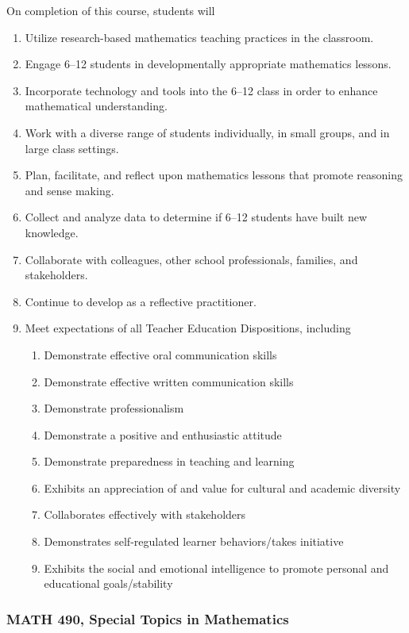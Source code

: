 \documentclass[11pt]{article}
\newenvironment{alphalist}{
\begin{enumerate}[label=(\arabic*),widest=107 ,leftmargin=25pt, itemsep=0pt]}
{\end{enumerate}}
\newenvironment{betalist}{
\begin{enumerate}[label=(\alph*),widest=zzz,leftmargin=25pt,itemsep=0pt]}
{\end{enumerate}}
\begin{document}
On completion of this course, students will
\begin{alphalist}
\item Utilize research-based mathematics teaching practices in the classroom.
\item Engage 6--12 students in developmentally appropriate mathematics lessons.
\item Incorporate technology and tools into the 6--12 class in order to enhance mathematical understanding.
\item Work with a diverse range of students individually, in small groups, and in large class settings.
\item Plan, facilitate, and reflect upon mathematics lessons that promote reasoning and sense making.
\item Collect and analyze data to determine if 6--12 students have built new knowledge. 
\item Collaborate with colleagues, other school professionals, families, and stakeholders.
\item Continue to develop as a reflective practitioner.
\item Meet expectations of all Teacher Education Dispositions, including
\begin{betalist}
\item Demonstrate effective oral communication skills
\item Demonstrate effective written communication skills
\item Demonstrate professionalism
\item Demonstrate a positive and enthusiastic attitude
\item Demonstrate preparedness in teaching and learning
\item Exhibits an appreciation of and value for cultural and academic diversity
\item Collaborates effectively with stakeholders
\item Demonstrates self-regulated learner behaviors/takes initiative
\item Exhibits the social and emotional intelligence to promote personal and educational goals/stability
\end{betalist}
\end{alphalist}

\subsubsection*{MATH 490, Special Topics in Mathematics}
\end{document}
